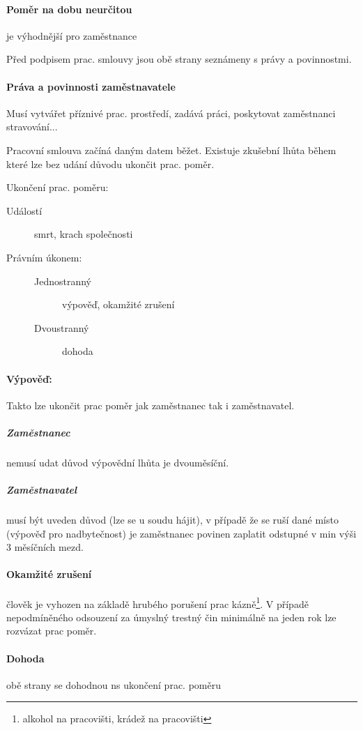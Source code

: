 \documentclass[10pt,a4paper,
twoside,%
]{report}
\begin{document}
\paragraph{Poměr na dobu neurčitou} je výhodnější pro zaměstnance


Před podpisem prac. smlouvy jsou obě strany seznámeny s právy a povinnostmi.

\paragraph{Práva a povinnosti zaměstnavatele} Musí vytvářet příznivé prac. prostředí, zadává práci, poskytovat zaměstnanci stravování...

Pracovní smlouva začíná daným datem běžet. Existuje zkušební lhůta během které lze bez udání důvodu ukončit prac. poměr.

Ukončení prac. poměru:
\begin{description}
\item[Událostí] smrt, krach společnosti

\item[Právním úkonem:]
\begin{description}
	\item[Jednostranný] výpověď, okamžité zrušení	
	\item[Dvoustranný] dohoda
\end{description}
\end{description}

\paragraph{Výpověď:} Takto lze ukončit prac poměr jak zaměstnanec tak i zaměstnavatel.
\subparagraph{Zaměstnanec} nemusí udat důvod výpovědní lhůta je dvouměsíční.
\subparagraph{Zaměstnavatel} musí být uveden důvod (lze se u soudu hájit), v případě že se ruší dané místo (výpověď pro nadbytečnost) je zaměstnanec povinen zaplatit odstupné v min výši 3 měsíčních mezd.

\paragraph{Okamžité zrušení} člověk je vyhozen na základě hrubého porušení prac kázně\footnote{alkohol na pracovišti, krádež na pracovišti}. V případě nepodmíněného odsouzení za úmyslný trestný čin minimálně na jeden rok lze rozvázat prac poměr.

\paragraph{Dohoda} obě strany se dohodnou ns ukončení prac. poměru
\end{document}
